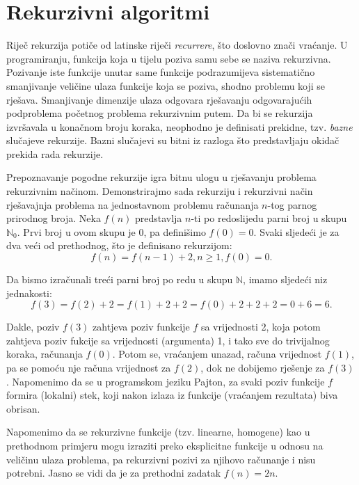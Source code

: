 \section{Rekurzivni algoritmi}
    
    
 Riječ rekurzija potiče od latinske riječi \textit{recurrere}, što doslovno znači vraćanje. U programiranju, funkcija koja u tijelu poziva samu sebe se naziva rekurzivna. Pozivanje iste funkcije unutar same funkcije podrazumijeva siste\-matično sma\-njivanje veličine ulaza funkcije koja se poziva,  shodno problemu koji se rješava. Smanjivanje dimenzije ulaza odgovara  rješavanju odgovarajućih podproblema početnog problema rekurzivnim putem. %
   Da bi se rekurzija izvršavala u konačnom broju koraka, neophodno je definisati prekidne, tzv. \textit{bazne} slučajeve rekurzije. Bazni slučajevi su bitni iz razloga što predstavljaju okidač prekida rada rekurzije. 
 
 Prepoznavanje pogodne rekurzije igra bitnu ulogu u rješavanju problema rekurzivnim načinom. Demonstrirajmo sada rekurziju i reku\-rzivni način rješavajnja problema na jednostavnom problemu računanja $n$-tog parnog prirodnog broja. Neka $f(n)$ predstavlja $n$-ti po redoslijedu parni broj u skupu $\mathbb{N}_0$. Prvi broj u ovom skupu je 0, pa definišimo $f(0)= 0$. Svaki sljedeći je za dva veći od prethodnog, %
 što je definisano rekurzijom: 
 $$f(n) = f(n-1) + 2, n \geq 1, f(0) = 0.$$
  
  Da bismo izračunali treći parni broj po redu u skupu $\mathbb{N}$, imamo sljedeći niz jednakosti:  
  $$f(3)= f(2) + 2 = f(1) + 2 + 2 = f(0) + 2 + 2 + 2 = 0 + 6 = 6.$$
 
 Dakle, poziv $f(3)$ zahtjeva poziv funkcije $f$ sa vrijednosti 2, koja potom zahtjeva poziv fukcije sa vrijednosti (argumenta) 1, i tako sve do trivijalnog koraka, računanja $f(0)$.  Potom se, vraćanjem unazad, računa vrijednost $f(1)$, pa se pomoću nje računa vrijednost za $f(2)$, dok ne dobijemo rješenje za $f(3)$. Napomenimo da se u programskom jeziku Pajton, za svaki poziv funkcije $f$ formira (lokalni) stek, koji nakon izlaza iz funkcije (vraćanjem rezultata) biva obrisan.  
 
Napomenimo da se rekurzivne funkcije (tzv. linearne, homogene) kao u prethodnom primjeru mogu izraziti preko eksplicitne funkcije u odnosu na veličinu ulaza problema, pa rekurzivni pozivi za njihovo  računanje i nisu potrebni. Jasno se vidi da je za prethodni zadatak $f(n)=2n$. 
 
